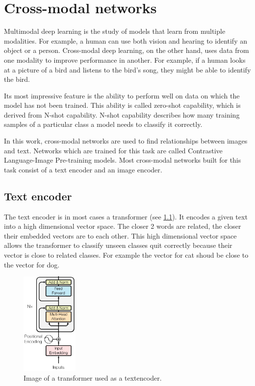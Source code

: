 %
%
%


\chapter{Cross-modal networks
    \label{chapter:crossmodalnetworks}}
    Multimodal deep learning is the study of models that learn from multiple modalities.
    For example, a human can use both vision and hearing to identify an object or a person.
    Cross-modal deep learning, on the other hand, uses data from one modality to improve performance in another.
    For example, if a human looks at a picture of a bird and listens to the bird's song, they might be able to identify the bird.
    
    Its most impressive feature is the ability to perform well on data on which the model has not been trained.
    This ability is called zero-shot capability, which is derived from N-shot capability.
    N-shot capability describes how many training samples of a particular class a model needs to classify it correctly.

    In this work, cross-modal networks are used to find relationships between images and text.
    Networks which are trained for this task are called Contrastive Language-Image Pre-training models.
    Most cross-modal networks built for this task consist of a text encoder and an image encoder.

    \section{Text encoder}
    The text encoder is in most cases a transformer (see \cref{fig:crossmodalnetworks:textencoder}).
    It encodes a given text into a high dimensional vector space.
    The closer 2 words are related, the closer their embedded vectors are to each other.
    This high dimensional vector space allows the transformer to classify unseen classes quit correctly because their vector is close to related classes.
    For example the vector for cat shoud be close to the vector for dog.

    \begin{figure}
        \centering
        \includegraphics[width=0.25\textwidth]{Images/crossmodalnetworks/The-Transformer-encoder-structure.png}
        \caption{Image of a transformer used as a textencoder\cite{fig:encoder}.}
        \label{fig:crossmodalnetworks:textencoder}
    \end{figure}
    


